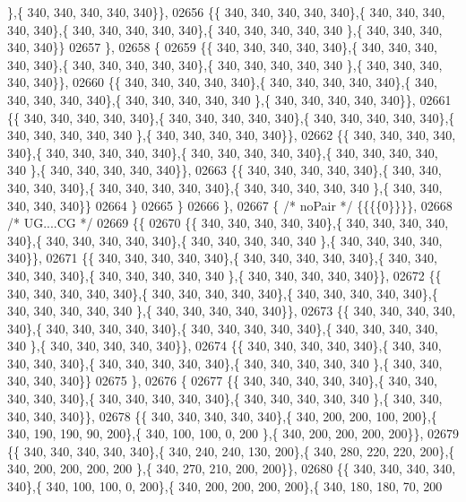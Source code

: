 \begin{DoxyCode}
      \},\{ 340, 340, 340, 340, 340\}\},
02656 \{\{ 340, 340, 340, 340, 340\},\{ 340, 340, 340, 340, 340\},\{ 340, 340, 340, 340, 340\},\{ 340, 340, 340, 340, 340
      \},\{ 340, 340, 340, 340, 340\}\}
02657 \},
02658 \{
02659 \{\{ 340, 340, 340, 340, 340\},\{ 340, 340, 340, 340, 340\},\{ 340, 340, 340, 340, 340\},\{ 340, 340, 340, 340, 340
      \},\{ 340, 340, 340, 340, 340\}\},
02660 \{\{ 340, 340, 340, 340, 340\},\{ 340, 340, 340, 340, 340\},\{ 340, 340, 340, 340, 340\},\{ 340, 340, 340, 340, 340
      \},\{ 340, 340, 340, 340, 340\}\},
02661 \{\{ 340, 340, 340, 340, 340\},\{ 340, 340, 340, 340, 340\},\{ 340, 340, 340, 340, 340\},\{ 340, 340, 340, 340, 340
      \},\{ 340, 340, 340, 340, 340\}\},
02662 \{\{ 340, 340, 340, 340, 340\},\{ 340, 340, 340, 340, 340\},\{ 340, 340, 340, 340, 340\},\{ 340, 340, 340, 340, 340
      \},\{ 340, 340, 340, 340, 340\}\},
02663 \{\{ 340, 340, 340, 340, 340\},\{ 340, 340, 340, 340, 340\},\{ 340, 340, 340, 340, 340\},\{ 340, 340, 340, 340, 340
      \},\{ 340, 340, 340, 340, 340\}\}
02664 \}
02665 \}
02666 \},
02667 \{ \textcolor{comment}{/* noPair */} \{\{\{\{0\}\}\}\},
02668 \textcolor{comment}{/* UG....CG */}
02669 \{\{
02670 \{\{ 340, 340, 340, 340, 340\},\{ 340, 340, 340, 340, 340\},\{ 340, 340, 340, 340, 340\},\{ 340, 340, 340, 340, 340
      \},\{ 340, 340, 340, 340, 340\}\},
02671 \{\{ 340, 340, 340, 340, 340\},\{ 340, 340, 340, 340, 340\},\{ 340, 340, 340, 340, 340\},\{ 340, 340, 340, 340, 340
      \},\{ 340, 340, 340, 340, 340\}\},
02672 \{\{ 340, 340, 340, 340, 340\},\{ 340, 340, 340, 340, 340\},\{ 340, 340, 340, 340, 340\},\{ 340, 340, 340, 340, 340
      \},\{ 340, 340, 340, 340, 340\}\},
02673 \{\{ 340, 340, 340, 340, 340\},\{ 340, 340, 340, 340, 340\},\{ 340, 340, 340, 340, 340\},\{ 340, 340, 340, 340, 340
      \},\{ 340, 340, 340, 340, 340\}\},
02674 \{\{ 340, 340, 340, 340, 340\},\{ 340, 340, 340, 340, 340\},\{ 340, 340, 340, 340, 340\},\{ 340, 340, 340, 340, 340
      \},\{ 340, 340, 340, 340, 340\}\}
02675 \},
02676 \{
02677 \{\{ 340, 340, 340, 340, 340\},\{ 340, 340, 340, 340, 340\},\{ 340, 340, 340, 340, 340\},\{ 340, 340, 340, 340, 340
      \},\{ 340, 340, 340, 340, 340\}\},
02678 \{\{ 340, 340, 340, 340, 340\},\{ 340, 200, 200, 100, 200\},\{ 340, 190, 190,  90, 200\},\{ 340, 100, 100,   0, 200
      \},\{ 340, 200, 200, 200, 200\}\},
02679 \{\{ 340, 340, 340, 340, 340\},\{ 340, 240, 240, 130, 200\},\{ 340, 280, 220, 220, 200\},\{ 340, 200, 200, 200, 200
      \},\{ 340, 270, 210, 200, 200\}\},
02680 \{\{ 340, 340, 340, 340, 340\},\{ 340, 100, 100,   0, 200\},\{ 340, 200, 200, 200, 200\},\{ 340, 180, 180,  70, 200

\end{DoxyCode}
